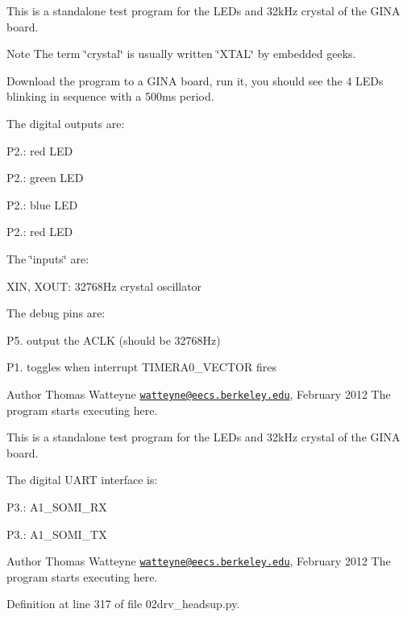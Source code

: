 This is a standalone test program for the L\+E\+Ds and 32k\+Hz crystal of the G\+I\+NA board. 

\begin{DoxyNote}{Note}
The term \char`\"{}crystal\char`\"{} is usually written \char`\"{}\+X\+T\+A\+L\char`\"{} by embedded geeks.
\end{DoxyNote}
Download the program to a G\+I\+NA board, run it, you should see the 4 L\+E\+Ds blinking in sequence with a 500ms period.

The digital outputs are\+:
\begin{DoxyItemize}
\item P2.\+: red L\+ED
\item P2.\+: green L\+ED
\item P2.\+: blue L\+ED
\item P2.\+: red L\+ED
\end{DoxyItemize}

The \char`\"{}inputs\char`\"{} are\+:
\begin{DoxyItemize}
\item X\+IN, X\+O\+UT\+: 32768\+Hz crystal oscillator
\end{DoxyItemize}

The debug pins are\+:
\begin{DoxyItemize}
\item P5. output the A\+C\+LK (should be 32768\+Hz)
\item P1. toggles when interrupt T\+I\+M\+E\+R\+A0\+\_\+\+V\+E\+C\+T\+OR fires
\end{DoxyItemize}

\begin{DoxyAuthor}{Author}
Thomas Watteyne \href{mailto:watteyne@eecs.berkeley.edu}{\tt watteyne@eecs.\+berkeley.\+edu}, February 2012 The program starts executing here.
\end{DoxyAuthor}
This is a standalone test program for the L\+E\+Ds and 32k\+Hz crystal of the G\+I\+NA board.

The digital U\+A\+RT interface is\+:
\begin{DoxyItemize}
\item P3.\+: A1\+\_\+\+S\+O\+M\+I\+\_\+\+RX
\item P3.\+: A1\+\_\+\+S\+O\+M\+I\+\_\+\+TX
\end{DoxyItemize}

\begin{DoxyAuthor}{Author}
Thomas Watteyne \href{mailto:watteyne@eecs.berkeley.edu}{\tt watteyne@eecs.\+berkeley.\+edu}, February 2012 The program starts executing here. 
\end{DoxyAuthor}


Definition at line 317 of file 02drv\+\_\+headsup.\+py.


